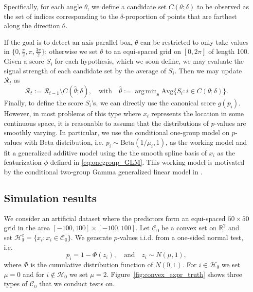 \documentclass{biometrika}
\newcommand{\cH}{\mathcal{H}}
\newcommand{\cC}{\mathcal{C}}
\newcommand{\cR}{\mathcal{R}}
\newcommand{\R}{\mathbb{R}}
\newcommand{\1}{\mathbf{1}}
\DeclareMathOperator*{\argmin}{arg\,min}
\begin{document}
Specifically, for each angle $\theta$, we define a candidate set $C(\theta; \delta)$ to be observed as the set of indices corresponding to the $\delta$-proportion of points that are farthest along the direction $\theta$. 

If the goal is to detect an axis-parallel box, $\theta$ can be restricted to only take values in $\{0, \frac{\pi}{2}, \pi, \frac{3\pi}{2}\}$; otherwise we set $\theta$ to an equi-spaced grid on $[0, 2\pi]$ of length 100. Given a score $S_{i}$ for each hypothesis, which we soon define, we may evaluate the signal strength of each candidate set by the average of $S_{i}$. Then we may update $\cR_{t}$ as  
\[\cR_{t} := \cR_{t-1}\setminus C(\hat{\theta}; \delta), \quad\mbox{with}\quad \hat{\theta} := \argmin_{\theta}\mathrm{Avg}\{S_{i}: i\in C(\theta; \delta)\}.
\]
Finally, to define the score $S_{i}$'s, we can directly use the canonical score $g(p_{i})$. However, in most problems of this type where $x_{i}$ represents the location in some continuous space, it is reasonable to assume that the distributions of $p$-values are smoothly varying. In particular, we use the conditional one-group model on $p$-values with Beta distribution, i.e. $p_i \sim \mathrm{Beta}(1 / \mu_i, 1)$, as the working model and fit a generalized additive model \citep{hastie90} using the the smooth spline basis of $x_{i}$ as the featurization $\phi$ defined in \eqref{eq:onegroup_GLM}. This working model is motivated by the conditional two-group Gamma generalized linear model in \cite{lei2018adapt}.

\subsection{Simulation results}\label{subsubsec:convex_simulation}
We consider an artificial dataset where the predictors form an equi-spaced $50\times 50$ grid in the area $[-100, 100]\times [-100, 100]$. 
Let $\cC_{0}$ be a convex set on $\R^{2}$ and set $\cH_{0}^{c} = \{x_{i}: x_{i}\in \cC_{0}\}$. We generate $p$-values i.i.d. from a one-sided normal test, i.e. 
\begin{equation}\label{eq:simul_pvals}
p_{i} = 1 - \Phi(z_{i}), \quad \mbox{and} \quad z_{i}\sim N(\mu, 1),
\end{equation}
where $\Phi$ is the cumulative distribution function of $N(0, 1)$. For $i\in \cH_{0}$ we set $\mu = 0$ and for $i\not\in \cH_{0}$ we set $\mu = 2$. Figure~\ref{fig:convex_expr_truth} shows three types of $\cC_{0}$ that we conduct tests on.
\end{document}
